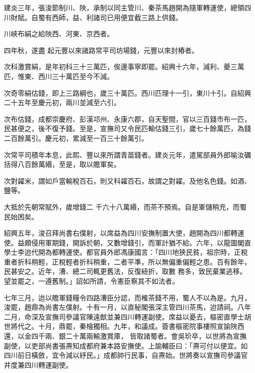 \begin{pinyinscope}
 建炎三年，張浚節制川、陜，承制以同主管川、秦茶馬趙開為隨軍轉運使，總領四川財賦。自蜀有西師，益、利諸司已用便宜截三路上供錢。



 川峽布絹之給陜西、河東、京西者。



 四年秋，遂盡
 起元豐以來諸路常平司坊場錢，元豐以來封樁者。



 次科激賞絹，是年初科三十三萬匹，俟邊事寧即罷。紹興十六年，減利、夔三萬匹，惟東、西川三十萬匹至今不減。



 次奇零絹估錢，即上三路綱也，歲三十萬匹。西川匹理十一引，東川十引。自紹興二十五年至慶元初，兩川並減至六引。



 次布估錢，成都崇慶府、彭漢邛州、永康六郡，自天聖間，官以三百錢市布一匹，民甚便之，後不復予錢。至是，宣撫司又令民匹輸估錢三引，歲七十餘萬匹，為錢二百餘萬引。慶元初，累減至一百三十餘萬引。



 次常平司積年本息，此熙、豐以來所謂青苗錢者。建炎元年，遣駕部員外郎喻汝礪括得八百餘萬緡，至是，取以贍軍矣。



 次對糴米，謂如戶當輸稅百石，則又科糴百石，故謂之對糴。及他名色錢。如酒、鹽等。



 大抵於先朝常賦外，歲增錢二
 千六十八萬緡，而茶不預焉。自是軍儲稍充，而蜀民始困矣。



 紹興五年，浚召拜尚書右僕射，以席益為四川安撫制置大使，趙開為四川都轉運使。益頗侵用軍期錢，開訴於朝，又數增錢引，而軍計猶不給。六年，以龍圖閣直學士李迨代開為都轉運使。都官員外郎馮康國言：「四川地狹民貧，祖宗時，正稅重者折科稍輕，正稅輕者折科稍重，二者平準，所以無偏重偏輕之患。百有餘年，民甚安之。近年，漕、總二司輒更舊法，反復紐折，取數
 務多，致民棄業逃移。望並罷之，一遵舊制。」詔如所請，令憲臣察其不如法者。



 七年三月，迨以贍軍錢糧令四路漕臣分認，而榷茶錢不用，蜀人不以為是。九月，浚罷，趙鼎為尚書左僕射。十有一月，以直秘閣張深主管四川茶馬，迨請祠。八年二月，命深及宣撫司參議官陳遠猷並兼四川轉運副使。席益以憂去，樞密直學士胡世將代之。十月，鼎罷，秦檜獨相。九年，和議成。簽書樞密院事樓照宣諭陜西還，以金四千兩、銀二十萬兩輸激賞庫，
 皆取諸蜀者。會吳玠卒，以世將為宣撫副使，以吏部尚書張燾知成都府兼本路安撫使。上諭輔臣曰：「燾可付以便宜。如四川前日橫斂，宜令減以紓民。」成都帥行民事，自燾始。世將奏以宣撫司參議官井度兼四川轉運副使。




\end{pinyinscope}

